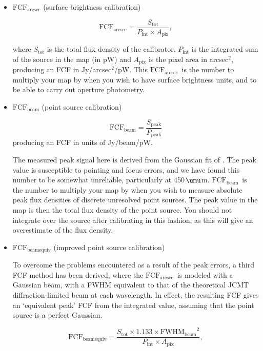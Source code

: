 \documentclass[twoside,11pt]{starlink}
\providecommand{\micron}{\mbox{\,${\umu}$m}}            %
\providecommand{\fcfbe}{$\mathrm{FCF_{beamequiv}}$}
\providecommand{\fcfb}{$\mathrm{FCF_{beam}}$}
\providecommand{\fcfa}{$\mathrm{FCF_{arcsec}}$}
\providecommand{\task}[1]{\textsf{#1}}
\providecommand{\beamfit}{\xref{\task{beamfit}}{sun95}{BEAMFIT}}
\begin{document}
\begin{itemize}

\item{\textbf{\fcfa} (surface brightness calibration)}

\begin{equation}
\label{eq:fcf_arcsec}
\mathrm{FCF_{arcsec}} = \frac{S_\mathrm{tot}}{P_\mathrm{int} \times
  A_\mathrm{pix}},
\end{equation}

where $S_\mathrm{tot}$ is the total flux density of the calibrator,
$P_\mathrm{int}$ is the integrated sum of the source in the map (in
pW) and $A_\mathrm{pix}$ is the pixel area in arcsec$^2$, producing an
FCF in Jy/arcsec$^2$/pW. This \fcfa\ is the number to
multiply your map by when you wish to have surface brightness units,
and to be able to carry out aperture photometry.

\item{\textbf{\fcfb} (point source calibration)}

\begin{equation}
\label{eq:fcf_beam}
\mathrm{FCF_{beam}} = \frac{S_\mathrm{{peak}}}{P_\mathrm{peak}}
\end{equation}
producing an FCF in units of Jy/beam/pW.

The measured peak signal here is derived from the Gaussian fit of
\beamfit. The peak value is susceptible to pointing and focus errors,
and we have found this number to be somewhat unreliable, particularly
at 450\micron. \fcfb\ is the number to multiply your
map by when you wish to measure absolute peak flux densities of
discrete unresolved point sources. The peak value in the map is then
the total flux density of the point source. You should not integrate
over the source after calibrating in this fashion, as this will give
an overestimate of the flux density.

\item{\textbf{\fcfbe} (improved point source calibration)}

To overcome the problems encountered as a result of the peak errors, a
third FCF method has been derived, where the \fcfa\
is modeled with a Gaussian beam, with a FWHM equivalent to that of the
theoretical JCMT diffraction-limited beam at each wavelength. In
effect, the resulting FCF gives an `equivalent peak' FCF from the
integrated value, assuming that the point source is a perfect
Gaussian.

\begin{equation}
\label{eq:fcf_beamequiv}
\mathrm{FCF_{beamequiv}} = \frac{S_\mathrm{tot} \times 1.133 \times
  {\mathrm{FWHM_{beam}}}^2}{P_\mathrm{int} \times A_\mathrm{pix}},
\end{equation}


\end{itemize}
\end{document}
